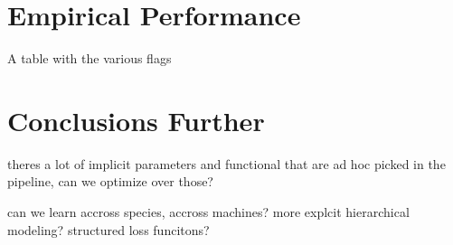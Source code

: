 \documentclass[11pt, a4paper]{article}
\begin{document}
\section{Empirical Performance}

A table with the various flags

\section{Conclusions Further}

theres a lot of implicit parameters and functional  that are ad hoc picked in the pipeline, can we optimize over those? 


can we learn accross species, accross machines? more explcit hierarchical modeling? structured loss funcitons? 
\end{document}
